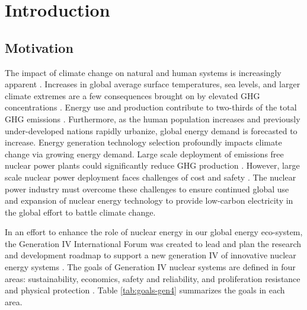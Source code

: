 \chapter{Introduction}
\label{chap:intro}


\section{Motivation}
The impact of climate change on natural and human systems is increasingly 
apparent \cite{noauthor_climate_2018}.
Increases in global average surface temperatures, sea levels, and larger climate 
extremes are a few consequences brought on by elevated \gls{GHG} concentrations 
\cite{noauthor_climate_2018}.
Energy use and production contribute to two-thirds of the total \gls{GHG}
emissions \cite{noauthor_climate_2018}.
Furthermore, as the human population increases and previously under-developed 
nations rapidly urbanize, global energy demand is forecasted to increase.  
Energy generation technology selection profoundly impacts climate change via 
growing energy demand. 
Large scale deployment of emissions free nuclear power plants could 
significantly reduce GHG production \cite{noauthor_climate_2018}.  
However, large scale nuclear power deployment faces challenges of cost and 
safety \cite{petti_future_2018}. 
The nuclear power industry must overcome these challenges to ensure continued 
global use and expansion of nuclear energy technology to provide low-carbon 
electricity in the global effort to battle climate change. 

In an effort to enhance the role of nuclear energy in our global energy 
eco-system, the Generation IV International Forum was created to lead and plan 
the research and development roadmap to support a new generation IV of innovative 
nuclear energy systems \cite{gif_technology_2002}.
The goals of Generation IV nuclear systems are defined in four areas: 
sustainability, economics, safety and reliability, and proliferation resistance 
and physical protection \cite{gif_technology_2002}. 
Table \ref{tab:goals-gen4} summarizes the goals in each area. 

